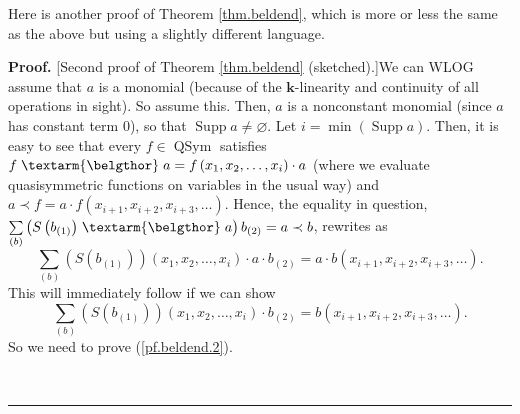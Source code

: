 \documentclass
[numbers=enddot,12pt,final,onecolumn,notitlepage,abstracton]{scrartcl}%
\theoremstyle{definition}
\newenvironment{proof}[1][Proof]{\noindent\textbf{#1.} }{\ \rule{0.5em}{0.5em}}
\newenvironment{noncompile}{}{}
\newcommand{\bel}{\left. \textarm{\belgthor} \right.}
\let\sumnonlimits\sum
\renewcommand{\sum}{\sumnonlimits\limits}
\begin{document}
\begin{noncompile}
Here is another proof of Theorem \ref{thm.beldend}, which is more or less the
same as the above but using a slightly different language.

\begin{proof}
[Second proof of Theorem \ref{thm.beldend} (sketched).]We can WLOG assume that
$a$ is a monomial (because of the $\mathbf{k}$-linearity and continuity of all
operations in sight). So assume this. Then, $a$ is a nonconstant monomial
(since $a$ has constant term $0$), so that $\operatorname*{Supp}%
a\neq\varnothing$. Let $i=\min\left(  \operatorname*{Supp}a\right)  $. Then,
it is easy to see that every $f\in\operatorname*{QSym}$ satisfies $f\bel
a=f\left(  x_{1},x_{2},\ldots,x_{i}\right)  \cdot a$ (where we evaluate
quasisymmetric functions on variables in the usual way) and $a\left.
\prec\right.  f=a\cdot f\left(  x_{i+1},x_{i+2},x_{i+3},\ldots\right)  $.
Hence, the equality in question, $\sum_{\left(  b\right)  }\left(  S\left(
b_{\left(  1\right)  }\right)  \bel a\right)  b_{\left(  2\right)  }=a\left.
\prec\right.  b$, rewrites as%
\[
\sum_{\left(  b\right)  }\left(  S\left(  b_{\left(  1\right)  }\right)
\right)  \left(  x_{1},x_{2},\ldots,x_{i}\right)  \cdot a\cdot b_{\left(
2\right)  }=a\cdot b\left(  x_{i+1},x_{i+2},x_{i+3},\ldots\right)  .
\]
This will immediately follow if we can show%
\begin{equation}
\sum_{\left(  b\right)  }\left(  S\left(  b_{\left(  1\right)  }\right)
\right)  \left(  x_{1},x_{2},\ldots,x_{i}\right)  \cdot b_{\left(  2\right)
}=b\left(  x_{i+1},x_{i+2},x_{i+3},\ldots\right)  . \label{pf.beldend.2}%
\end{equation}
So we need to prove (\ref{pf.beldend.2}).


\end{proof}
\end{noncompile}
\end{document}
